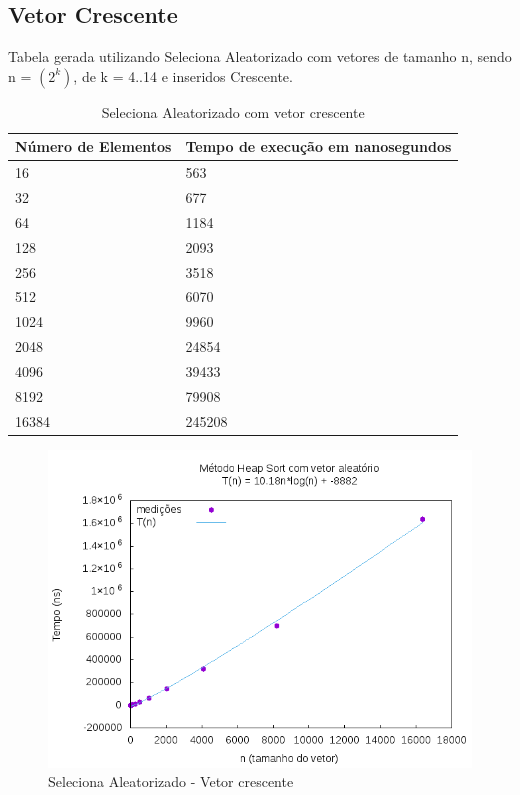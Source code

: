 \documentclass[12pt,a4paper,twoside]{report}
\begin{document}
\subsection{Vetor Crescente}
Tabela gerada utilizando Seleciona Aleatorizado com vetores de tamanho n, sendo n = $(2^k)$, de k = 4..14 e inseridos Crescente.
\begin{table}[H]
\centering
\caption{Seleciona Aleatorizado com vetor crescente}
\label{my-label}
\begin{tabular}{|l|l|}
\hline
\multicolumn{1}{|c|}{\textbf{Número de Elementos}} & \multicolumn{1}{c|}{\textbf{Tempo de execução em nanosegundos}} \\ \hline
16 & 563 \\ \hline
32 & 677 \\ \hline
64 & 1184 \\ \hline
128 & 2093 \\ \hline
256 & 3518 \\ \hline
512 & 6070 \\ \hline
1024 & 9960 \\ \hline
2048 & 24854 \\ \hline
4096 & 39433 \\ \hline
8192 & 79908 \\ \hline
16384 & 245208 \\ \hline

\end{tabular}
\end{table}

\begin{figure}[H]
    \centering
    \includegraphics[width=0.7\linewidth]{graficos/HeapSort/vIntAleatorio/vIntAleatorio.png}
  \caption{Seleciona Aleatorizado - Vetor crescente}
\end{figure}
\end{document}
